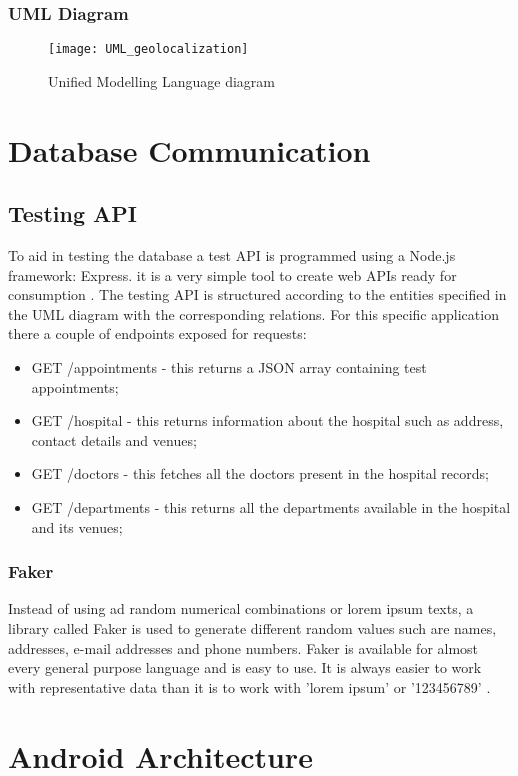 \subsubsection{UML Diagram}
\begin{landscape}
\begin{figure}[!h]
\centering
\texttt{[image: UML\_geolocalization]}
\caption{Unified Modelling Language diagram}
\end{figure}
\end{landscape}
\section{Database Communication}
\subsection{Testing API}
To aid in testing the database a test API is programmed using a Node.js framework: Express. it is a very simple tool to create web APIs ready for consumption \cite{Express2019}. The testing API is structured according to the entities specified in the UML diagram with the corresponding relations. For this specific application there a couple of endpoints exposed for requests:
\begin{itemize}
\item GET /appointments - this returns a JSON array containing test appointments;
\item GET /hospital - this returns information about the hospital such as address, contact details and venues;
\item GET /doctors - this fetches all the doctors present in the hospital records;
\item GET /departments - this returns all the departments available in the hospital and its venues;
\end{itemize}
\subsubsection{Faker}
Instead of using ad random numerical combinations or lorem ipsum texts, a library called Faker is used to generate different random values such are names, addresses, e-mail addresses and phone numbers. Faker is available for almost every general purpose language and is easy to use. It is always easier to work with representative data than it is to work with 'lorem ipsum' or '123456789' \cite{DanieleFaraglia2014}.
\section{Android Architecture}
